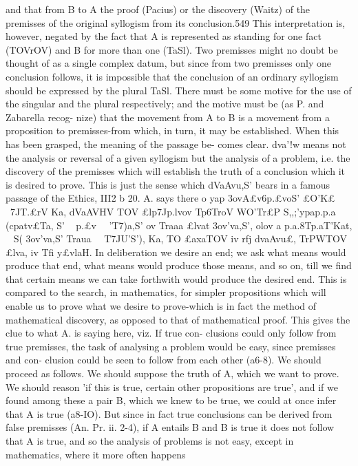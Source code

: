 {{{{{{{{{{and that from B to A the proof (Pacius) or the discovery (Waitz)
of the premisses of the original syllogism from its conclusion.549
This interpretation is, however, negated by the fact that A is
represented as standing for one fact (TOVrOV) and B for more than
one (TaSl). Two premisses might no doubt be thought of as a
single complex datum, but since from two premisses only one
conclusion follows, it is impossible that the conclusion of an
ordinary syllogism should be expressed by the plural TaSl. There
must be some motive for the use of the singular and the plural
respectively; and the motive must be (as P. and Zabarella recog-
nize) that the movement from A to B is a movement from a
proposition to premisses-from which, in turn, it may be
established.
When this has been grasped, the meaning of the passage be-
comes clear. dva'\vl!w means not the analysis or reversal of a
given syllogism but the analysis of a problem, i.e. the discovery
of the premisses which will establish the truth of a conclusion
which it is desired to prove. This is just the sense which dVaAvu,S'
bears in a famous passage of the Ethics, III2 b 20. A. says there
o yap {3ovA£v6p.£voS' £O'K£ ~7JT.£rV Ka, dVaAVHV TOV £lp7Jp.lvov Tp6TroV
WO'Tr£P S,,;'ypap.p.a (cpatv£Ta, S' ~ p.£v ~~'T7)a,S' ov Traaa £lvat {3ov'\£va,S',
olov a{ p.a.8T}p.aT'Kat, ~ S( {3ov'\£va,S' Traua ~~T7JU'S'), Ka, TO £axaTOV iv
rfj dvaAvu£, TrPWTOV £lva, iv Tfi y£vlaH. In deliberation we desire
an end; we ask what means would produce that end, what means
would produce those means, and so on, till we find that certain
means we can take forthwith would produce the desired end.
This is compared to the search, in mathematics, for simpler
propositions which will enable us to prove what we desire to
prove-which is in fact the method of mathematical discovery,
as opposed to that of mathematical proof.
This gives the clue to what A. is saying here, viz. If true con-
clusions could only follow from true premisses, the task of
analysing a problem would be easy, since premisses and con-
clusion could be seen to follow from each other (a6-8). We should
proceed as follows. We should suppose the truth of A, which
we want to prove. We should reason 'if this is true, certain
other propositions are true', and if we found among these a pair
B, which we knew to be true, we could at once infer that A is
true (a8-IO). But since in fact true conclusions can be derived
from false premisses (An. Pr. ii. 2-4), if A entails B and B is true
it does not follow that A is true, and so the analysis of problems
is not easy, except in mathematics, where it more often happens
}}}}}}}}}}}}}
